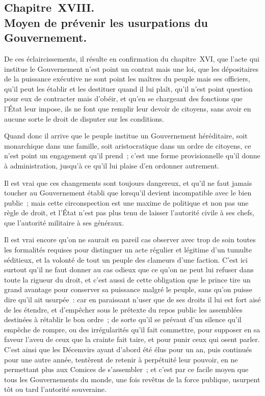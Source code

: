 \documentclass[french,twoside]{book} %
\begin{document}
\subsection[{Chapitre XVIII. Moyen de prévenir les usurpations du Gouvernement.}]{Chapitre XVIII. \\
Moyen de prévenir les usurpations du Gouvernement.}
\noindent De ces éclaircissements, il résulte en confirmation du chapitre XVI, que l’acte qui institue le Gouvernement n’est point un contrat mais une loi, que les dépositaires de la puissance exécutive ne sont point les maîtres du peuple mais ses officiers, qu’il peut les établir et les destituer quand il lui plaît, qu’il n’est point question pour eux de contracter mais d’obéir, et qu’en se chargeant des fonctions que l’État leur impose, ils ne font que remplir leur devoir de citoyens, sans avoir en aucune sorte le droit de disputer sur les conditions.\par
Quand donc il arrive que le peuple institue un Gouvernement héréditaire, soit monarchique dans une famille, soit aristocratique dans un ordre de citoyens, ce n’est point un engagement qu’il prend ; c’est une forme provisionnelle qu’il donne à administration, jusqu’à ce qu’il lui plaise d’en ordonner autrement.\par
Il est vrai que ces changements sont toujours dangereux, et qu’il ne faut jamais toucher au Gouvernement établi que lorsqu’il devient incompatible avec le bien public ; mais cette circonspection est une maxime de politique et non pas une règle de droit, et l’État n’est pas plus tenu de laisser l’autorité civile à ses chefs, que l’autorité militaire à ses généraux.\par
Il est vrai encore qu’on ne saurait en pareil cas observer avec trop de soin toutes les formalités requises pour distinguer un acte régulier et légitime d’un tumulte séditieux, et la volonté de tout un peuple des clameurs d’une faction. C’est ici surtout qu’il ne faut donner au cas odieux que ce qu’on ne peut lui refuser dans toute la rigueur du droit, et c’est aussi de cette obligation que le prince tire un grand avantage pour conserver sa puissance malgré le peuple, sans qu’on puisse dire qu’il ait usurpée : car en paraissant n’user que de ses droits il lui est fort aisé de les étendre, et d’empêcher sous le prétexte du repos public les assemblées destinées à rétablir le bon ordre ; de sorte qu’il se prévaut d’un silence qu’il empêche de rompre, ou des irrégularités qu’il fait commettre, pour supposer en sa faveur l’aveu de ceux que la crainte fait taire, et pour punir ceux qui osent parler. C’est ainsi que les Décemvirs ayant d’abord été élus pour un an, puis continués pour une autre année, tentèrent de retenir à perpétuité leur pouvoir, en ne permettant plus aux Comices de s’assembler ; et c’est par ce facile moyen que tous les Gouvernements du monde, une fois revêtus de la force publique, usurpent tôt ou tard l’autorité souveraine.\par
\end{document}
